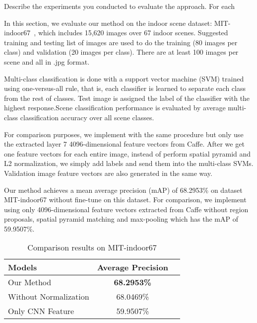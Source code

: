 Describe the experiments you conducted to evaluate the approach.  For each

In this section, we evaluate our method on the indoor scene dataset:
MIT-indoor67~\cite{Quattoni:2009:RIS},
which includes 15,620 images over 67 indoor scenes. Suggested training and
testing list of images are used to do the training (80 images per class)
and validation (20 images per class). There are at least 100 images per
scene and all in .jpg format.

Multi-class classification is done with a support vector machine (SVM) trained
using one-versus-all rule, that is, each classifier is learned to separate each
class from the rest of classes. Test image is assigned the label of the
classifier with the highest response.Scene classification performance is
evaluated by average multi-class classification accuracy over all scene classes.

For comparison purposes, we implement with the same procedure but only use
the extracted layer 7 4096-dimensional feature vectors from Caffe. After we get
one feature vectors for each entire image, instead of perform spatial pyramid
and L2 normalization, we simply add labels and send them into the multi-class
SVMs. Validation image feature vectors are also generated in the same way.

Our
method achieves a mean average precision (mAP) of 68.2953\% on dataset
MIT-indoor67\cite{Quattoni:2009:RIS} without fine-tune on this dataset.
For comparison, we implement using only 4096-dimensional feature vectors
extracted from Caffe without region proposals, spatial pyramid matching 
and max-pooling which has the mAP of 59.9507\%.

\begin{table}[ht]
	\caption{Comparison results on MIT-indoor67}
	\centering
	\begin{tabular}{l c c}
	\hline \hline
	Models                & Average Precision \\ \hline
	Our Method  	      & {\bf{68.2953\%}} \\
	Without Normalization & 68.0469\% \\
        Only CNN Feature      & 59.9507\% \\
	\hline
	\end{tabular}
	\label{tab:overall}
\end{table}

